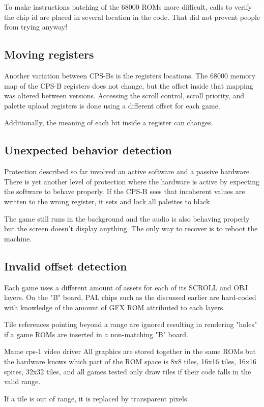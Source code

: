 To make instructions patching of the 68000 ROMs more difficult, calls to verify the chip id are placed in several location in the code. That did not prevent people from trying anyway\cite{strider_conversion}!

\subsection{Moving registers}
Another variation between CPS-Bs is the registers locations. The 68000 memory map of the CPS-B registers does not change, but the offset inside that mapping was altered between versions. Accessing the scroll control, scroll priority, and palette upload registers is done using a different offset for each game.

Additionally, the meaning of each bit inside a register can changes.




\subsection{Unexpected behavior detection}
Protection described so far involved an active software and a passive hardware. There is yet another level of protection where the hardware is active by expecting the software to behave properly. If the CPS-B sees that incoherent values are written to the wrong register, it sets and lock all palettes to black. 

The game still runs in the background and the audio is also behaving properly but the screen doesn't display anything. The only way to recover is to reboot the machine\cite{petitSecurity}.

\subsection{Invalid offset detection}

Each game uses a different amount of assets for each of its SCROLL and OBJ layers. On the "B" board, PAL chips such as the  discussed earlier are hard-coded with knowledge of the amount of GFX ROM attributed to each layers.

Tile references pointing beyond a range are ignored resulting in rendering "holes" if a game ROMs are inserted in a non-matching "B" board.

\begin{q}{Mame cps-1 video driver}
All graphics are
stored together in the same ROMs but the hardware knows which part of the ROM space
is 8x8 tiles, 16x16 tiles, 16x16 spites, 32x32 tiles, and all games tested only
draw tiles if their code falls in the valid range. 

If a tile is out of range, it is replaced by transparent pixels.
\end{q}

